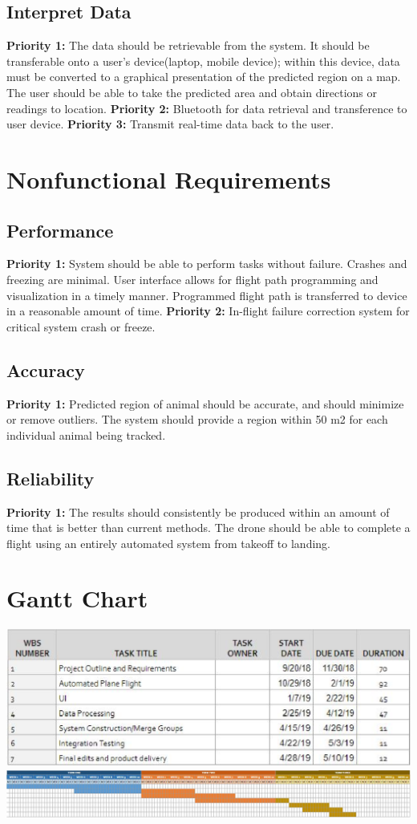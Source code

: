 \documentclass[onecolumn, draftclsnofoot,10pt, compsoc]{IEEEtran}
\begin{document}
\subsection{Interpret Data}
\textbf{Priority 1:} The data should be retrievable from the system. It should be transferable onto a user’s device(laptop, mobile device); within this device, data must be converted to a graphical presentation of the predicted region on a map. The user should be able to take the predicted  area and obtain directions or readings to location.
\newline
\textbf{Priority 2:} Bluetooth for data retrieval and transference to user device.
\newline
\textbf{Priority 3:} Transmit real-time data back to the user.

\section{Nonfunctional Requirements}
\subsection{Performance}
\textbf{Priority 1:} System should be able to perform tasks without failure. Crashes and freezing are minimal. User interface allows for flight path programming and visualization in a timely manner. Programmed flight path is transferred to device in a reasonable amount of time. 
\newline
\textbf{Priority 2:} In-flight failure correction system for critical system crash or freeze.
\subsection{Accuracy}
\textbf{Priority 1:} Predicted region of animal should be accurate, and should minimize or remove outliers. The system should provide a region within 50 m2  for each individual animal being tracked.

\subsection{Reliability}
\textbf{Priority 1:} The results should consistently be produced within an amount of time that is better than current methods. The drone should be able to complete a flight using an entirely automated system from takeoff to landing.

\section{Gantt Chart}

\includegraphics[width=\textwidth]{ganttable.eps}
\newline
\newline
\newline
\includegraphics[width=\textwidth]{gantchart.eps}
\end{document}
